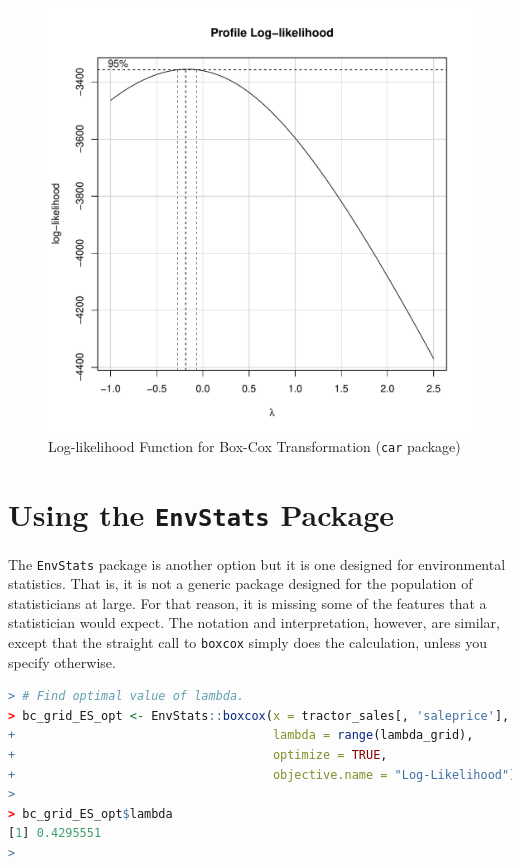 \documentclass[11pt]{book}
\begin{document}
\begin{figure}[h!]
  \centering
  \includegraphics[scale = 0.5, keepaspectratio=true]{../Figures/plot_like_car}
  \caption{Log-likelihood Function for Box-Cox Transformation (\texttt{car} package)} \label{fig:plot_like_car}
\end{figure}


\clearpage
\section*{Using the \texttt{EnvStats} Package}


The \texttt{EnvStats} package is another option
but it is one designed for environmental statistics.
That is, it is not a generic package designed for the population of statisticians at large.
For that reason, it is missing some of the features that
a statistician would expect.
The notation and interpretation, however, are similar, 
except that the straight call to \texttt{boxcox}
simply does the calculation, 
unless you specify otherwise.

\begin{lstlisting}[language=R]
> # Find optimal value of lambda.
> bc_grid_ES_opt <- EnvStats::boxcox(x = tractor_sales[, 'saleprice'],
+                                    lambda = range(lambda_grid),
+                                    optimize = TRUE,
+                                    objective.name = "Log-Likelihood")
> 
> bc_grid_ES_opt$lambda
[1] 0.4295551
> 
\end{lstlisting}
\end{document}

